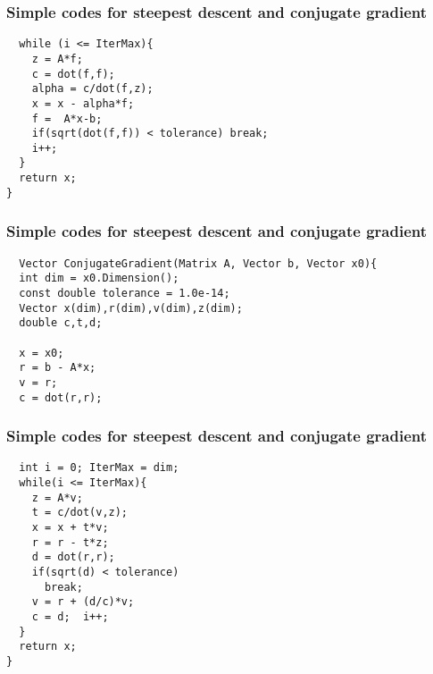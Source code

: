 \documentclass{beamer}
\begin{document}
\begin{frame}
\frametitle{Simple codes for  steepest descent and conjugate gradient}

\begin{block}{}
\begin{verbatim}
  while (i <= IterMax){
    z = A*f;
    c = dot(f,f);
    alpha = c/dot(f,z);
    x = x - alpha*f;
    f =  A*x-b;
    if(sqrt(dot(f,f)) < tolerance) break;
    i++;
  }
  return x;
} 
\end{verbatim}
\end{block}
\end{frame}

\begin{frame}
\frametitle{Simple codes for  steepest descent and conjugate gradient}

\begin{block}{}
\begin{verbatim}
  Vector ConjugateGradient(Matrix A, Vector b, Vector x0){
  int dim = x0.Dimension();
  const double tolerance = 1.0e-14;
  Vector x(dim),r(dim),v(dim),z(dim);
  double c,t,d;

  x = x0;
  r = b - A*x;
  v = r;
  c = dot(r,r);
\end{verbatim}
\end{block}
\end{frame}

\begin{frame}
\frametitle{Simple codes for  steepest descent and conjugate gradient}

\begin{block}{}
\begin{verbatim}
  int i = 0; IterMax = dim;
  while(i <= IterMax){
    z = A*v;
    t = c/dot(v,z);
    x = x + t*v;
    r = r - t*z;
    d = dot(r,r);
    if(sqrt(d) < tolerance)
      break;
    v = r + (d/c)*v;
    c = d;  i++;
  }
  return x;
} 
\end{verbatim}
\end{block}
\end{frame}
\end{document}
